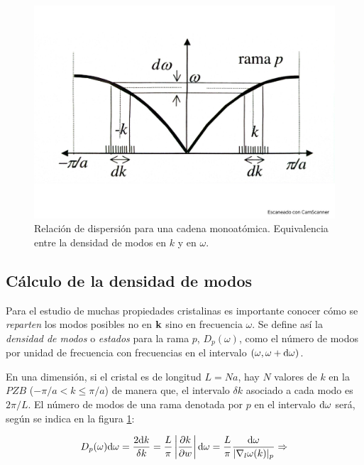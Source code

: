 \begin{figure}[h!] \centering
    \includegraphics[scale=0.36]{Cuerpo/Ch_05/Fotos libro 1.pdf}
    \caption{Relación de dispersión para una cadena monoatómica. Equivalencia entre la densidad de modos en $k$ y en $\omega$.}
    \label{Fig:05-01}
\end{figure}    


\subsection{Cálculo de la densidad de modos}

Para el estudio de muchas propiedades cristalinas es importante conocer cómo se \textit{reparten} los modos posibles no en $\mathbf{k}$ sino en frecuencia $\omega$. Se define así la \textit{densidad de modos} o \textit{estados} para la rama $p$, $D_p (\omega)$, como el número de modos por unidad de frecuencia con frecuencias en el intervalo $(\omega,\omega+\mathrm{d} \omega)$.

En una dimensión, si el cristal es de longitud $L=Na$, hay $N$ valores de $k$ en la $PZB$ ($-\pi/a < k\leq \pi/a$) de manera que, el intervalo $\delta k$ asociado a cada modo es $2 \pi / L$. El número de modos de una rama denotada por $p$ en el intervalo $\mathrm{d} \omega$ será, según se indica en la figura \ref{Fig:05-01}:

\begin{equation*}
	D_p (\omega) \mathrm{d} \omega = \frac{2 \mathrm{d} k}{\delta k} = \frac{L}{\pi} \left| \frac{\partial k}{\partial w}  \right| \mathrm{d} \omega = \frac{L}{\pi} \frac{\mathrm{d} \omega}{|\nabla_l \omega (k)|_p} \Rightarrow
\end{equation*} 

